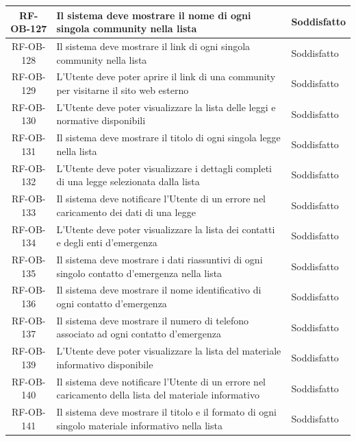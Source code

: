\documentclass[a4paper,12pt]{article}
\begin{document}
\begin{center}
\begin{longtable}{|c|p{8.5cm}|>{\centering\arraybackslash}p{4cm}|}
RF-OB-127 & Il sistema deve mostrare il nome di ogni singola community nella lista & Soddisfatto \\
\hline

RF-OB-128 & Il sistema deve mostrare il link di ogni singola community nella lista & Soddisfatto \\
\hline

RF-OB-129 & L'Utente deve poter aprire il link di una community per visitarne il sito web esterno & Soddisfatto \\
\hline

RF-OB-130 & L'Utente deve poter visualizzare la lista delle leggi e normative disponibili & Soddisfatto \\
\hline

RF-OB-131 & Il sistema deve mostrare il titolo di ogni singola legge nella lista & Soddisfatto \\
\hline

RF-OB-132 & L'Utente deve poter visualizzare i dettagli completi di una legge selezionata dalla lista & Soddisfatto \\
\hline

RF-OB-133 & Il sistema deve notificare l'Utente di un errore nel caricamento dei dati di una legge & Soddisfatto \\
\hline

RF-OB-134 & L'Utente deve poter visualizzare la lista dei contatti e degli enti d'emergenza & Soddisfatto \\
\hline

RF-OB-135 & Il sistema deve mostrare i dati riassuntivi di ogni singolo contatto d'emergenza nella lista & Soddisfatto \\
\hline

RF-OB-136 & Il sistema deve mostrare il nome identificativo di ogni contatto d'emergenza & Soddisfatto \\
\hline

RF-OB-137 & Il sistema deve mostrare il numero di telefono associato ad ogni contatto d'emergenza & Soddisfatto \\
\hline

RF-OB-139 & L'Utente deve poter visualizzare la lista del materiale informativo disponibile & Soddisfatto \\
\hline

RF-OB-140 & Il sistema deve notificare l'Utente di un errore nel caricamento della lista del materiale informativo & Soddisfatto \\
\hline

RF-OB-141 & Il sistema deve mostrare il titolo e il formato di ogni singolo materiale informativo nella lista & Soddisfatto \\
\hline


\end{longtable}
\end{center}
\end{document}
